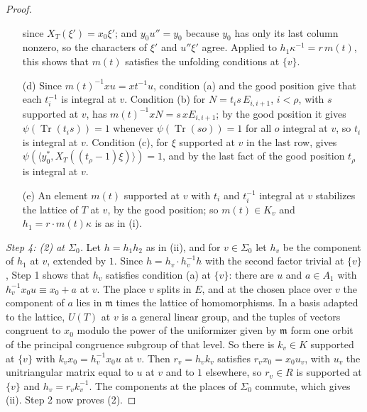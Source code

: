 \begin{proof}
\begin{enumerate}
  since $X_T(\xi')=x_0\xi'$; and $y_0u''=y_0$ because $y_0$ has only its last
  column nonzero, so the characters of $\xi'$ and $u''\xi'$ agree. Applied to
  $h_1\kappa^{-1}=r\,m(t)$, this shows that $m(t)$ satisfies the unfolding
  conditions at $\{v\}$.
\item[(d)] Since $m(t)^{-1}xu=xt^{-1}u$, condition (a) and the good position give
  that each $t_i^{-1}$ is integral at $v$. Condition (b) for
  $N=t_is\,E_{i,i+1}$, $i<\rho$, with $s$ supported at $v$, has
  $m(t)^{-1}xN=s\,xE_{i,i+1}$; by the good position it gives
  $\psi(\operatorname{Tr}(t_is))=1$ whenever $\psi(\operatorname{Tr}(so))=1$ for
  all $o$ integral at $v$, so $t_i$ is integral at $v$. Condition (c), for $\xi$
  supported at $v$ in the last row, gives
  $\psi(\langle y_0^*,X_T((t_\rho-1)\xi)\rangle)=1$, and by the last fact of the
  good position $t_\rho$ is integral at $v$.
\item[(e)] An element $m(t)$ supported at $v$ with $t_i$ and $t_i^{-1}$ integral
  at $v$ stabilizes the lattice of $T$ at $v$, by the good position; so
  $m(t)\in K_v$ and $h_1=r\cdot m(t)\kappa$ is as in (i).
\end{enumerate}

\emph{Step 4: (2) at $\Sigma_0$.} Let $h=h_1h_2$ as in (ii), and for
$v\in\Sigma_0$ let $h_v$ be the component of $h_1$ at $v$, extended by $1$.
Since $h=h_v\cdot h_v^{-1}h$ with the second factor trivial at $\{v\}$, Step 1
shows that $h_v$ satisfies condition (a) at $\{v\}$: there are $u$ and
$a\in A_1$ with $h_v^{-1}x_0u\equiv x_0+a$ at $v$. The place $v$ splits in $E$,
and at the chosen place over $v$ the component of $a$ lies in $\mathfrak m$ times
the lattice of homomorphisms. In a basis adapted to the lattice, $U(T)$ at $v$
is a general linear group, and the tuples of vectors congruent to $x_0$ modulo
the power of the uniformizer given by $\mathfrak m$ form one orbit of the
principal congruence subgroup of that level. So there is $k_v\in K$ supported at
$\{v\}$ with $k_vx_0=h_v^{-1}x_0u$ at $v$. Then $r_v=h_vk_v$ satisfies
$r_vx_0=x_0u_v$, with $u_v$ the unitriangular matrix equal to $u$ at $v$ and to
$1$ elsewhere, so $r_v\in R$ is supported at $\{v\}$ and $h_v=r_vk_v^{-1}$. The
components at the places of $\Sigma_0$ commute, which gives (ii). Step 2 now
proves (2).


\end{proof}
